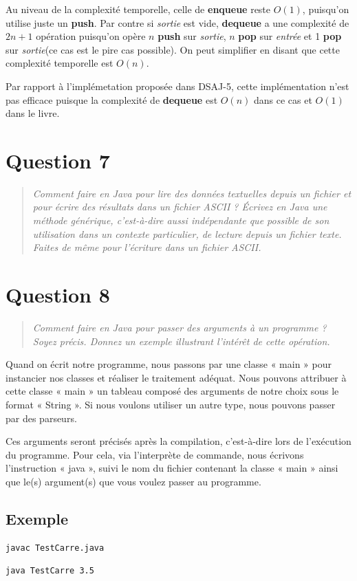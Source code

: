 \documentclass[11pt,a4paper]{article}
\begin{document}
Au niveau de la complexité temporelle, celle de \textbf{enqueue} reste $O(1)$, puisqu'on utilise juste un \textbf{push}. Par contre si \textit{sortie} est vide, \textbf{dequeue} a une complexité de $2n+1$ opération puisqu'on opère $n$ \textbf{push} sur \textit{sortie}, $n$ \textbf{pop} sur \textit{entrée} et 1 \textbf{pop} sur \textit{sortie}(ce cas est le pire cas possible). On peut simplifier en disant que cette complexité temporelle est $O(n)$.

Par rapport à l'implémetation proposée dans DSAJ-5, cette implémentation n'est pas efficace puisque la complexité de \textbf{dequeue} est $O(n)$ dans ce cas et $O(1)$ dans le livre.

\section{Question 7}
\begin{quotation}
\textit{Comment faire en Java pour lire des données textuelles depuis un fichier et pour
écrire des résultats dans un fichier ASCII ? Écrivez en Java une méthode générique,
c’est-à-dire aussi indépendante que possible de son utilisation dans un contexte
particulier, de lecture depuis un fichier texte. Faites de même pour l’écriture dans
un fichier ASCII.}
\end{quotation}


\section{Question 8}
\begin{quotation}
\textit{Comment faire en Java pour passer des arguments à un programme ? Soyez précis.
Donnez un exemple illustrant l’intérêt de cette opération.}
\end{quotation}

Quand on écrit notre programme, nous passons par une classe « main » pour instancier nos classes et réaliser le traitement adéquat. Nous pouvons attribuer à cette classe « main » un tableau composé des arguments de notre choix sous le format « String ». Si nous voulons utiliser un autre type, nous pouvons passer par des parseurs.

Ces arguments seront précisés après la compilation, c’est-à-dire lors de l’exécution du programme. Pour cela, via l’interprète de commande, nous écrivons l’instruction « java », suivi le nom du fichier contenant la classe « main » ainsi que le(s) argument(s) que vous voulez passer au programme.
\subsection*{Exemple}


\begin{lstlisting}[caption=Compilation]
javac TestCarre.java
\end{lstlisting}
\begin{lstlisting}[caption=Exécution (3.5 correspond à l’argument que l’on passe au programme)]
java TestCarre 3.5
\end{lstlisting}
\end{document}
